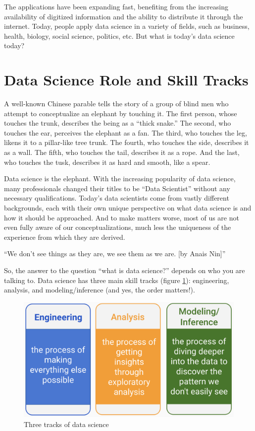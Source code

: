 \documentclass[
  12pt,
]{krantz}
\renewenvironment{quote}{\begin{VF}}{\end{VF}}
\begin{document}
The applications have been expanding fast, benefiting from the increasing availability of digitized information and the ability to distribute it through the internet. Today, people apply data science in a variety of fields, such as business, health, biology, social science, politics, etc. But what is today's data science today?

\hypertarget{data-science-role-and-skill-tracks}{%
\section{Data Science Role and Skill Tracks}\label{data-science-role-and-skill-tracks}}

A well-known Chinese parable tells the story of a group of blind men who attempt to conceptualize an elephant by touching it. The first person, whose touches the trunk, describes the being as a ``thick snake.'' The second, who touches the ear, perceives the elephant as a fan. The third, who touches the leg, likens it to a pillar-like tree trunk. The fourth, who touches the side, describes it as a wall. The fifth, who touches the tail, describes it as a rope. And the last, who touches the tusk, describes it as hard and smooth, like a spear.

Data science is the elephant. With the increasing popularity of data science, many professionals changed their titles to be ``Data Scientist'' without any necessary qualifications. Today's data scientists come from vastly different backgrounds, each with their own unique perspective on what data science is and how it should be approached. And to make matters worse, most of us are not even fully aware of our conceptualizations, much less the uniqueness of the experience from which they are derived.

\begin{quote}
``We don't see things as they are, we see them as we are. {[}by Anais Nin{]}''
\end{quote}

So, the answer to the question ``what is data science?'' depends on who you are talking to. Data science has three main skill tracks (figure \ref{fig:threetracks}): engineering, analysis, and modeling/inference (and yes, the order matters!).

\begin{figure}

{\centering \includegraphics[width=0.8\linewidth]{images/threetracks} 

}

\caption{Three tracks of data science}\label{fig:threetracks}
\end{figure}
\end{document}
